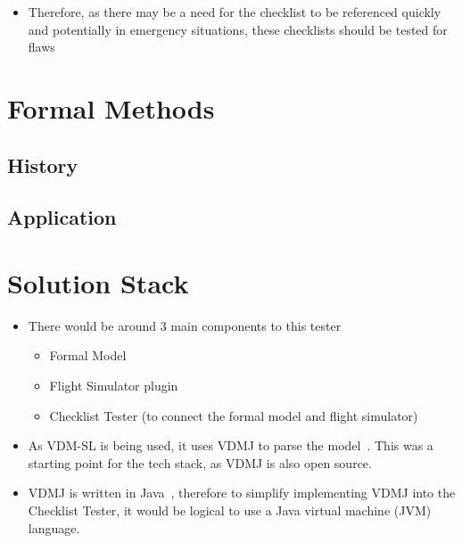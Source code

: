 \documentclass[../dissertation.tex]{subfiles}
\begin{document}
\begin{itemize}
  \item Therefore, as there may be a need for the checklist to be
    referenced quickly and potentially in emergency situations,
    these checklists should be tested for flaws 
\end{itemize}


\section{Formal Methods}

\subsection{History}


\subsection{Application}


\section{Solution Stack}
\begin{itemize}
  \item There would be around 3 main components to this tester
    \begin{itemize}
      \item Formal Model
      \item Flight Simulator plugin
      \item Checklist Tester (to connect the formal model and flight simulator)
    \end{itemize}
  \item As VDM-SL is being used, it uses VDMJ to parse the model~\cite{vdmj}. This was a starting
    point for the tech stack, as VDMJ is also open source.
  \item VDMJ is written in Java~\cite{vdmj}, therefore to simplify implementing VDMJ into the
    Checklist Tester, it would be logical to use a Java virtual machine (JVM) language.
\end{itemize}
\end{document}
